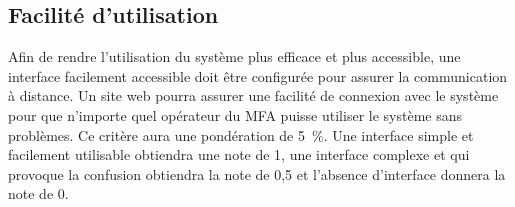 

\subsection{Facilité d’utilisation}
\label{s:cdc_com_faciutil}

Afin de rendre l’utilisation du système plus efficace et plus accessible, une interface facilement accessible doit être configurée pour assurer la communication à distance.
Un site web pourra assurer une facilité de connexion avec le système pour que n’importe quel opérateur du MFA puisse utiliser le système sans problèmes.
Ce critère aura une pondération de 5~\%.
Une interface simple et facilement utilisable obtiendra une note de 1, une interface complexe et qui provoque la confusion obtiendra la note de 0,5 et l’absence d’interface donnera la note de 0.